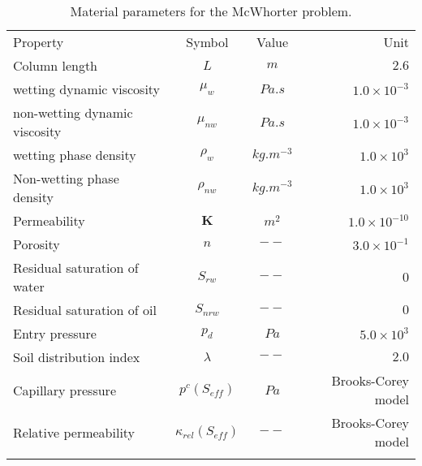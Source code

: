 \begin{table}[!htb]
\begin{tabular}{lccr}
\hline\hline\noalign{\smallskip}
Property & Symbol & Value & Unit \\
\noalign{\smallskip}\hline\noalign{\smallskip}
Column length & $L$ & $m$ & $2.6$  \\
wetting dynamic viscosity &  $\mu_w$ & $Pa.s$ & $1.0\times10^{-3}$ \\
non-wetting dynamic viscosity & $\mu_{nw}$ & $Pa.s$ & $1.0\times10^{-3}$ \\
wetting phase density &  $\rho_w$ &$kg.m^{-3}$ & $1.0\times10^{3}$ \\
Non-wetting phase density &  $\rho_{nw}$ & $kg.m^{-3}$ & $1.0\times10^{3}$ \\
Permeability & $\mathbf K$ & $ m^2$ & $1.0\times 10^{-10}$ \\
Porosity & $n$ & $--$ & $3.0\times10^{-1}$ \\
Residual saturation of water &  $S_{rw}$ & $--$ & $0$ \\
Residual saturation of oil &  $S_{nrw}$ & $--$ & $0$ \\
Entry pressure &  $p_d$ & $Pa$ & $5.0\times10^{3}$ \\
Soil distribution index &  $\lambda$ & $--$ & $2.0$ \\
Capillary pressure & $p^c(S_{eff})$ & $Pa$ & Brooks-Corey model\\
Relative permeability & $\kappa_{rel}(S_{eff})$ & $--$ & Brooks-Corey model \\
\noalign{\smallskip}\hline\hline
\end{tabular}
\caption{Material parameters for the McWhorter problem.}
\end{table}
